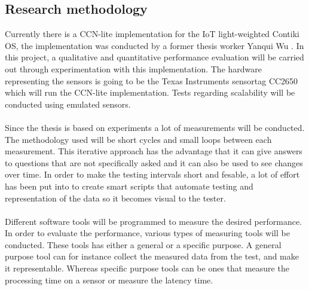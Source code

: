 \subsection{Research methodology}
Currently there is a CCN-lite implementation for the IoT light-weighted Contiki OS, the implementation was conducted by a former thesis worker Yanqui Wu \cite{yanqui}. In this project, a qualitative and quantitative performance evaluation will be carried out through experimentation with this implementation. The hardware representing the sensors is going to be the Texas Instruments sensortag CC2650 which will run the CCN-lite implementation. Tests regarding scalability will be conducted using emulated sensors.
\\\\
Since the thesis is based on experiments a lot of measurements will be conducted. The methodology used will be short cycles and small loops between each measurement. This iterative approach has the advantage that it can give answers to questions that are not specifically asked and it can also be used to see changes over time. 
In order to make the testing intervals short and fesable, a lot of effort has been put into to create smart scripts that automate testing and representation of the data so it becomes visual to the tester. 
\\\\
Different software tools will be programmed to measure the desired performance. 
In order to evaluate the performance, various types of measuring tools will be conducted. These tools has either a general or a specific purpose. A general purpose tool can for instance collect the measured data from the test, and make it representable. Whereas specific purpose tools can be ones that measure the processing time on a sensor or measure the latency time. 

